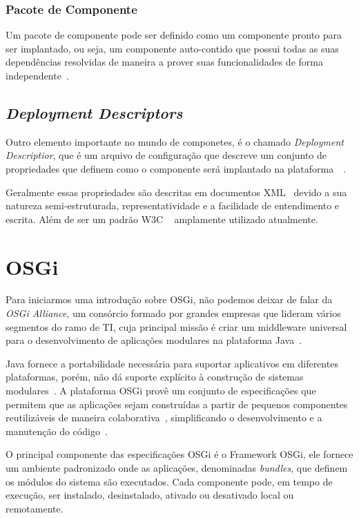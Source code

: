 \subsubsection{Pacote de Componente}
Um pacote de componente pode ser definido como um componente pronto para ser implantado, ou seja, um componente auto-contido que possui todas as suas dependências resolvidas de maneira a prover suas funcionalidades de forma independente~\cite{cervantes2005techical}.

\subsection{\textit{Deployment Descriptors}}
Outro elemento importante no mundo de componetes, é o chamado \textit{Deployment Descriptior}, que é um arquivo de configuração que descreve um conjunto de propriedades que definem como o componente será implantado na plataforma~\cite{deploy}~\cite{deployoasis}. 

Geralmente essas propriedades são descritas em documentos XML~\cite{xml} devido a sua natureza semi-estruturada, representatividade e a facilidade de entendimento e escrita. Além de ser um padrão W3C ~\cite{w3c} amplamente utilizado atualmente.

\section{OSGi}
\label{sec:osgi}

Para iniciarmos uma introdução sobre OSGi, não podemos deixar de falar da \textit{OSGi Alliance}, um consórcio formado por grandes empresas que lideram vários segmentos do ramo de TI, cuja principal missão é criar um middleware universal para o desenvolvimento de aplicações modulares na plataforma Java~\cite{osgiorg}.

Java fornece a portabilidade necessária para suportar aplicativos em diferentes plataformas, porém, não dá suporte explícito à construção de sistemas modulares~\cite{hall2010osgi}. A plataforma OSGi provê um conjunto de especificações que permitem que as aplicações sejam construídas a partir de pequenos componentes reutilizáveis de maneira colaborativa~\cite{osgiorg}, simplificando o desenvolvimento e a manutenção do código~\cite{hall2010osgi}.

O principal componente das especificações OSGi é o Framework OSGi, ele fornece um ambiente padronizado onde as aplicações, denominadas \textit{bundles}, que definem os módulos do sistema são executados. Cada componente pode, em tempo de execução,  ser instalado, desinstalado, ativado ou desativado local ou remotamente.

